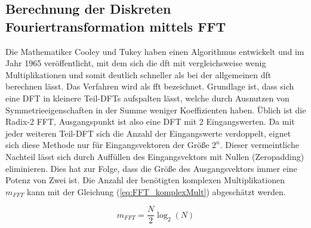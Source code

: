 \subsection{Berechnung der Diskreten Fouriertransformation mittels FFT}\label{sec:BerechnungFFT}
Die Mathematiker Cooley und Tukey haben einen Algorithmus entwickelt und im Jahr 1965 veröffentlicht, mit dem sich die \gls{dft} mit vergleichsweise wenig Multiplikationen
und somit deutlich schneller als bei der allgemeinen \gls{dft} berechnen lässt. Das Verfahren wird als \gls{fft} bezeichnet.
Grundlage ist, dass sich eine DFT
in kleinere Teil-DFTs aufspalten lässt, welche durch Ausnutzen von Symmetrieeigenschaften in der Summe weniger Koeffizienten haben. 
Üblich ist die Radix-2 FFT, Ausgangspunkt ist also eine DFT mit 2 Eingangswerten.
Da mit jeder weiteren Teil-DFT sich die Anzahl der Eingangswerte verdoppelt, eignet sich diese Methode nur für Eingangsvektoren der Größe $2^n$. Dieser
vermeintliche Nachteil lässt sich durch Auffüllen des Eingangsvektors mit Nullen (Zeropadding) eliminieren. Dies hat zur Folge, dass die Größe des Ausgangsvektors
immer eine Potenz von Zwei ist. 
Die Anzahl der benötigten komplexen Multiplikationen $m_{FFT}$ kann mit der Gleichung (\ref{eq:FFT_komplexMult}) abgeschätzt werden.


\begin{equation}\label{eq:FFT_komplexMult}
 m_{FFT} = \frac{N}{2}\log_2(N)
\end{equation}









